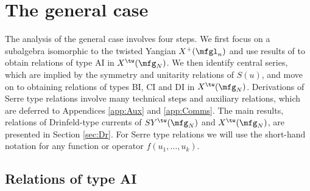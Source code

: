 \documentclass{amsart}
\numberwithin{equation}{section}
\theoremstyle{remark}
\renewcommand{\,}{\kern 0.1em} %
\begin{document}

\section{The general case} \label{sec:gen}

The analysis of the general case involves four steps. We first focus on a subalgebra isomorphic to the twisted Yangian $X^+(\mfgl_n)$ and use results of \cite{LWZ25a} to obtain relations of type AI in $X^\tw(\mfg_{N})$. We then identify central series, which are implied by the symmetry and unitarity relations of $S(u)$, and move on to obtaining relations of types BI, CI and DI in $X^\tw(\mfg_{N})$. Derivations of Serre type relations involve many technical steps and auxiliary relations, which are deferred to Appendices \ref{app:Aux} and \ref{app:Comms}. 
The main results, relations of Drinfeld-type currents of $SY^\tw(\mfg_{N})$ and $X^\tw(\mfg_{N})$, are presented in Section \ref{sec:Dr}. For Serre type relations we will use the short-hand notation
%
%
for any function or operator $f(u_1,\ldots, u_k)$.





\subsection{Relations of type AI} \label{sec:gen-AI}
\end{document}
